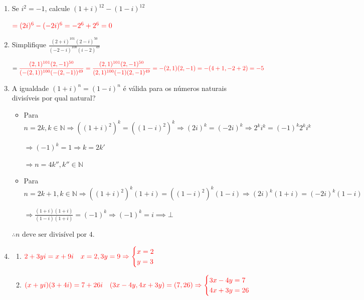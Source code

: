 \documentclass[12pt, openright, a4paper, twoside, english, brazil]{article}
\newenvironment{qitem}{
  \color{black}
\item}{\vspace{10pt}}
\newenvironment{qmitem}{
  \color{black}
\item
\begin{enumerate}[\bfseries a)]}{
\end{enumerate}\vspace{10pt}}
\begin{document}
\begin{enumerate}[\bfseries 1.]
  \begin{qitem} %
    Se $i^2 = -1$, calcule $(1+i)^{12} - (1-i)^{12}$

    $\color{red}= (2i)^6 - (-2i)^6 = -2^6 + 2^6 = 0$
  \end{qitem}

  \begin{qitem} %
    Simplifique $\displaystyle
    \frac{(2+i)^{101}(2-i)^{50}}{(-2-i)^{100}(i-2)^{49}}$

    $=\color{red}\displaystyle
    \frac{(2,1)^{101}(2,-1)^{50}}{(-(2,1))^{100}(-(2,-1))^{49}} =
    \frac{(2,1)^{101}(2,-1)^{50}}{(2,1)^{100}(-1)(2,-1)^{49}} =
    -(2,1)(2,-1) = -(4+1, -2+2) = -5$
  \end{qitem}

  \begin{qitem} %
    A igualdade $(1+i)^n = (1-i)^n$ é válida para os números
    naturais divisíveis por qual natural?

    \color{red}
    \begin{itemize}
      \item Para $n = 2k, k \in \mathbb{N} \Rightarrow ((1+i)^2)^k =
        ((1-i)^2)^k \Rightarrow (2i)^k = (-2i)^k \Rightarrow 2^k i^k =
        (-1)^k 2^k i^k$

        $\Rightarrow (-1)^k = 1 \Rightarrow k = 2k'$

        $\Rightarrow n = 4k'', k'' \in \mathbb{N}$

      \item Para $n = 2k+1, k \in \mathbb{N} \Rightarrow ((1+i)^2)^k(1+i) =
        ((1-i)^2)^k(1-i) \Rightarrow (2i)^k(1+i) = (-2i)^k(1-i)$

        $\displaystyle \Rightarrow \frac{(1+i)(1+i)}{(1-i)(1+i)} = (-1)^k
        \Rightarrow (-1)^k = i \implies \bot$
    \end{itemize}

    $\therefore n\text{ deve ser divisível por 4.}$
  \end{qitem}

  \begin{qmitem} %
  \item $\color{red}2+3yi = x+9i \quad x=2, 3y=9 \Rightarrow
    \begin{cases} x=2 \\ y=3
    \end{cases}$

  \item $\color{red}(x+yi)(3+4i) = 7+26i \quad (3x-4y, 4x+3y) =
    (7,26) \Rightarrow
    \begin{cases} 3x-4y=7 \\ 4x+3y=26
    \end{cases}$


\end{qmitem}
\end{enumerate}
\end{document}
